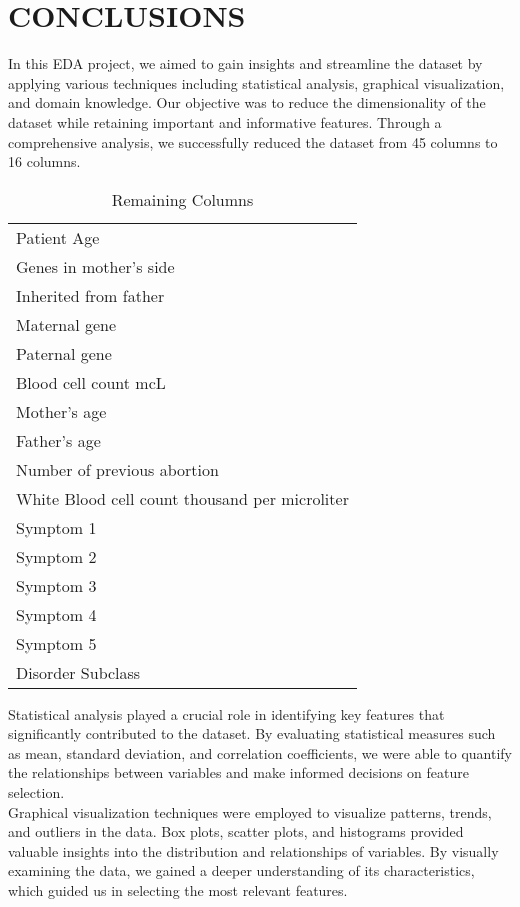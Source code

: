 
\chapter{CONCLUSIONS}

In this EDA project, we aimed to gain insights and streamline the dataset by applying various techniques including statistical analysis, graphical visualization, and domain knowledge. Our objective was to reduce the dimensionality of the dataset while retaining important and informative features. Through a comprehensive analysis, we successfully reduced the dataset from 45 columns to 16 columns.
\begin{table}[htpb]
	\caption{Remaining Columns}
	\centering
	\begin{tabular}{|l|}
		\hline
		Patient Age\\
		Genes in mother's side\\
		Inherited from father\\
		Maternal gene\\
		Paternal gene\\
		Blood cell count mcL\\
		Mother's age\\
		Father's age\\
		Number of previous abortion\\
		White Blood cell count thousand per microliter\\
		Symptom 1 \\
		Symptom 2\\
		Symptom 3\\
		Symptom 4\\
		Symptom 5 \\                          
		Disorder Subclass\\ 
		\hline
	\end{tabular}
	\label{tab 2}
\end{table}
\newline
\noindent
Statistical analysis played a crucial role in identifying key features that significantly contributed to the dataset. By evaluating statistical measures such as mean, standard deviation, and correlation coefficients, we were able to quantify the relationships between variables and make informed decisions on feature selection.\\
\noindent
Graphical visualization techniques were employed to visualize patterns, trends, and outliers in the data. Box plots, scatter plots, and histograms provided valuable insights into the distribution and relationships of variables. By visually examining the data, we gained a deeper understanding of its characteristics, which guided us in selecting the most relevant features.\\
